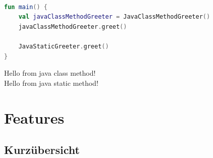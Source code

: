 \documentclass[11pt]{article}
\begin{document}
    \begin{lstlisting}[language=Kotlin, caption={Main.kt}]

fun main() {
    val javaClassMethodGreeter = JavaClassMethodGreeter()
    javaClassMethodGreeter.greet()

    JavaStaticGreeter.greet()
}
    \end{lstlisting}

    \begin{tcolorbox}[colback=black!5!white, colframe=black, title=Ausgabe]
        Hello from java class method!\\
        Hello from java static method!\\
    \end{tcolorbox}

    \section{Features}

    \subsection{Kurzübersicht}
\end{document}
